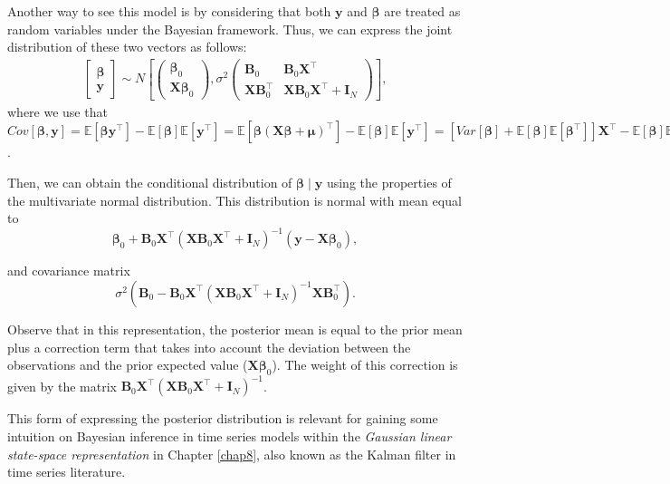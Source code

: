 Another way to see this model is by considering that both \( \bm{y} \) and \( \bm{\beta} \) are treated as random variables under the Bayesian framework. Thus, we can express the joint distribution of these two vectors as follows:
\begin{align*}
	\begin{bmatrix}
		\bm{\beta}\\ 
		\bm{y}
	\end{bmatrix}\sim N\left [ \begin{pmatrix}
		\bm{\beta}_{0} \\
		\bm{X}\bm{\beta}_{0}
	\end{pmatrix} , \sigma^2\begin{pmatrix}
		\bm{B}_{0} & \bm{B}_{0} \bm{X}^{\top} \\ 
		\bm{X}\bm{B}_{0}^{\top} & \bm{X}\bm{B}_{0}\bm{X}^{\top}+\bm{I}_N
	\end{pmatrix}\right ],
\end{align*}
where we use that $Cov[\bm{\beta},\bm{y}]=\mathbb{E}[\bm{\beta}\bm{y}^{\top}]-\mathbb{E}[\bm{\beta}]\mathbb{E}[\bm{y}^{\top}]=\mathbb{E}[\bm{\beta}(\bm{X}\bm{\beta}+\bm{\mu})^{\top}]-\mathbb{E}[\bm{\beta}]\mathbb{E}[\bm{y}^{\top}]=[Var[\bm{\beta}]+\mathbb{E}[\bm{\beta}]\mathbb{E}[\bm{\beta}^{\top}]]\bm{X}^{\top}-\mathbb{E}[\bm{\beta}]\mathbb{E}[\bm{y}^{\top}]=\sigma^2\bm{B}_0\bm{X}^{\top}+\bm{\beta}_0\bm{\beta}_0^{\top}\bm{X}^{\top}-\bm{\beta}_0\bm{\beta}_0^{\top}\bm{X}^{\top}=\sigma^2\bm{B}_0\bm{X}^{\top}$.

Then, we can obtain the conditional distribution of \( \bm{\beta} \mid \bm{y} \) using the properties of the multivariate normal distribution. This distribution is normal with mean equal to
\[
\bm{\beta}_{0} + \bm{B}_{0} \bm{X}^{\top} \left( \bm{X} \bm{B}_{0} \bm{X}^{\top} + \bm{I}_N \right)^{-1} (\bm{y} - \bm{X} \bm{\beta}_{0}),
\]

and covariance matrix
\[
\sigma^2 \left( \bm{B}_{0} - \bm{B}_{0} \bm{X}^{\top} \left( \bm{X} \bm{B}_{0} \bm{X}^{\top} + \bm{I}_N \right)^{-1} \bm{X} \bm{B}_{0}^{\top} \right).
\]

Observe that in this representation, the posterior mean is equal to the prior mean plus a correction term that takes into account the deviation between the observations and the prior expected value (\( \bm{X} \bm{\beta}_{0} \)). The weight of this correction is given by the matrix \( \bm{B}_{0} \bm{X}^{\top} \left( \bm{X} \bm{B}_{0} \bm{X}^{\top} + \bm{I}_N \right)^{-1} \).

This form of expressing the posterior distribution is relevant for gaining some intuition on Bayesian inference in time series models within the \textit{Gaussian linear state-space representation} in Chapter \ref{chap8}, also known as the Kalman filter in time series literature.


